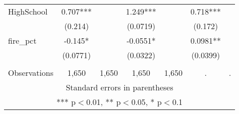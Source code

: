 \begin{tabular}{lcccccc}
HighSchool & 0.707*** &  & 1.249*** &  & 0.718*** &  \\
 & (0.214) &  & (0.0719) &  & (0.172) &  \\
fire\_pct & -0.145* &  & -0.0551* &  & 0.0981** &  \\
 & (0.0771) &  & (0.0322) &  & (0.0399) &  \\
 &  &  &  &  &  &  \\
 Observations & 1,650 & 1,650 & 1,650 & 1,650 & . & . \\ \hline
\multicolumn{7}{c}{ Standard errors in parentheses} \\
\multicolumn{7}{c}{ *** p$<$0.01, ** p$<$0.05, * p$<$0.1} \\
\end{tabular}
